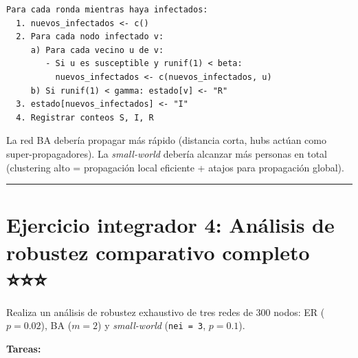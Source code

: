 \documentclass[
  letterpaper,
  DIV=11,
  numbers=noendperiod]{scrreprt}
\begin{document}
\begin{tcolorbox}[enhanced jigsaw, toprule=.15mm, colframe=quarto-callout-note-color-frame, coltitle=black, titlerule=0mm, colback=white, breakable, leftrule=.75mm, arc=.35mm, bottomtitle=1mm, toptitle=1mm, rightrule=.15mm, bottomrule=.15mm, left=2mm, title=\textcolor{quarto-callout-note-color}{\faInfo}\hspace{0.5em}{💡 Pista 3 --- Pseudocódigo}, colbacktitle=quarto-callout-note-color!10!white, opacityback=0, opacitybacktitle=0.6]

\begin{verbatim}
Para cada ronda mientras haya infectados:
  1. nuevos_infectados <- c()
  2. Para cada nodo infectado v:
     a) Para cada vecino u de v:
        - Si u es susceptible y runif(1) < beta:
          nuevos_infectados <- c(nuevos_infectados, u)
     b) Si runif(1) < gamma: estado[v] <- "R"
  3. estado[nuevos_infectados] <- "I"
  4. Registrar conteos S, I, R
\end{verbatim}

La red BA debería propagar más rápido (distancia corta, hubs actúan como
super-propagadores). La \emph{small-world} debería alcanzar más personas
en total (clustering alto = propagación local eficiente + atajos para
propagación global).

\end{tcolorbox}

\begin{center}\rule{0.5\linewidth}{0.5pt}\end{center}

\section*{Ejercicio integrador 4: Análisis de robustez comparativo
completo
⭐⭐⭐}\label{ejercicio-integrador-4-anuxe1lisis-de-robustez-comparativo-completo}


Realiza un análisis de robustez exhaustivo de tres redes de 300 nodos:
ER (\(p = 0.02\)), BA (\(m = 2\)) y \emph{small-world}
(\texttt{nei\ =\ 3}, \(p = 0.1\)).

\textbf{Tareas:}
\end{document}
